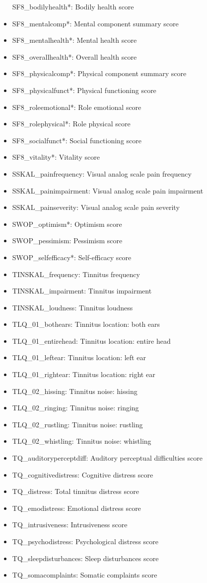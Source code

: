 \documentclass[
  oneside]{book}
\begin{document}
\begin{itemize}
  SF8\_bodilyhealth*: Bodily health score
\item
  SF8\_mentalcomp*: Mental component summary score
\item
  SF8\_mentalhealth*: Mental health score
\item
  SF8\_overallhealth*: Overall health score
\item
  SF8\_physicalcomp*: Physical component summary score
\item
  SF8\_physicalfunct*: Physical functioning score
\item
  SF8\_roleemotional*: Role emotional score
\item
  SF8\_rolephysical*: Role physical score
\item
  SF8\_socialfunct*: Social functioning score
\item
  SF8\_vitality*: Vitality score
\item
  SSKAL\_painfrequency: Visual analog scale pain frequency
\item
  SSKAL\_painimpairment: Visual analog scale pain impairment
\item
  SSKAL\_painseverity: Visual analog scale pain severity
\item
  SWOP\_optimism*: Optimism score
\item
  SWOP\_pessimism: Pessimism score
\item
  SWOP\_selfefficacy*: Self-efficacy score
\item
  TINSKAL\_frequency: Tinnitus frequency
\item
  TINSKAL\_impairment: Tinnitus impairment
\item
  TINSKAL\_loudness: Tinnitus loudness
\item
  TLQ\_01\_bothears: Tinnitus location: both ears
\item
  TLQ\_01\_entirehead: Tinnitus location: entire head
\item
  TLQ\_01\_leftear: Tinnitus location: left ear
\item
  TLQ\_01\_rightear: Tinnitus location: right ear
\item
  TLQ\_02\_hissing: Tinnitus noise: hissing
\item
  TLQ\_02\_ringing: Tinnitus noise: ringing
\item
  TLQ\_02\_rustling: Tinnitus noise: rustling
\item
  TLQ\_02\_whistling: Tinnitus noise: whistling
\item
  TQ\_auditoryperceptdiff: Auditory perceptual difficulties score
\item
  TQ\_cognitivedistress: Cognitive distress score
\item
  TQ\_distress: Total tinnitus distress score
\item
  TQ\_emodistress: Emotional distress score
\item
  TQ\_intrusiveness: Intrusiveness score
\item
  TQ\_psychodistress: Psychological distress score
\item
  TQ\_sleepdisturbances: Sleep disturbances score
\item
  TQ\_somacomplaints: Somatic complaints score
\end{itemize}

\printbibliography
\end{document}
